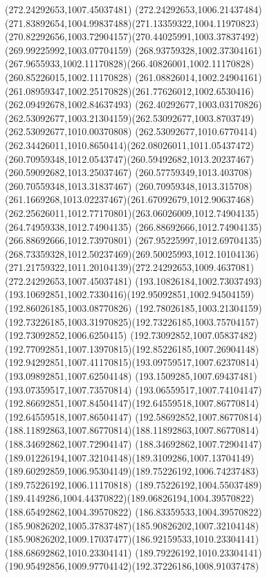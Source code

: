 {{\moveto(272.24292653,1007.45037481)
\curveto(272.24292653,1006.21437484)(271.83892654,1004.99837488)(271.13359322,1004.11970823)
\curveto(270.82292656,1003.72904157)(270.44025991,1003.37837492)(269.99225992,1003.07704159)
\curveto(268.93759328,1002.37304161)(267.9655933,1002.11170828)(266.40826001,1002.11170828)
\lineto(260.85226015,1002.11170828)
\lineto(261.08826014,1002.24904161)
\curveto(261.08959347,1002.25170828)(261.77626012,1002.6530416)(262.09492678,1002.84637493)
\curveto(262.40292677,1003.03170826)(262.53092677,1003.21304159)(262.53092677,1003.8703749)
\lineto(262.53092677,1010.00370808)
\curveto(262.53092677,1010.6770414)(262.34426011,1010.8650414)(262.08026011,1011.05437472)
\curveto(260.70959348,1012.0543747)(260.59492682,1013.20237467)(260.59092682,1013.25037467)
\lineto(260.57759349,1013.403708)
\lineto(260.70559348,1013.31837467)
\curveto(260.70959348,1013.315708)(261.1669268,1013.02237467)(261.67092679,1012.90637468)
\curveto(262.25626011,1012.77170801)(263.06026009,1012.74904135)(264.74959338,1012.74904135)
\lineto(266.88692666,1012.74904135)
\lineto(266.88692666,1012.73970801)
\curveto(267.95225997,1012.69704135)(268.73359328,1012.50237469)(269.50025993,1012.10104136)
\curveto(271.21759322,1011.20104139)(272.24292653,1009.4637081)(272.24292653,1007.45037481)
\moveto(193.10826184,1002.73037493)
\curveto(193.10692851,1002.7330416)(192.95092851,1002.94504159)(192.86026185,1003.08770826)
\curveto(192.78026185,1003.21304159)(192.73226185,1003.31970825)(192.73226185,1003.75704157)
\lineto(192.73092852,1006.6250415)
\curveto(192.73092852,1007.05837482)(192.77092851,1007.13970815)(192.85226185,1007.26904148)
\curveto(192.94292851,1007.41170815)(193.09759517,1007.62370814)(193.09892851,1007.62504148)
\lineto(193.1509285,1007.69437481)
\lineto(193.07359517,1007.73570814)
\curveto(193.06559517,1007.74104147)(192.86692851,1007.84504147)(192.64559518,1007.86770814)
\lineto(192.64559518,1007.86504147)
\curveto(192.58692852,1007.86770814)(188.11892863,1007.86770814)(188.11892863,1007.86770814)
\lineto(188.34692862,1007.72904147)
\curveto(188.34692862,1007.72904147)(189.01226194,1007.32104148)(189.3109286,1007.13704149)
\curveto(189.60292859,1006.95304149)(189.75226192,1006.74237483)(189.75226192,1006.11170818)
\lineto(189.75226192,1004.55037489)
\curveto(189.4149286,1004.44370822)(189.06826194,1004.39570822)(188.65492862,1004.39570822)
\curveto(186.83359533,1004.39570822)(185.90826202,1005.37837487)(185.90826202,1007.32104148)
\curveto(185.90826202,1009.17037477)(186.92159533,1010.23304141)(188.68692862,1010.23304141)
\curveto(189.79226192,1010.23304141)(190.95492856,1009.97704142)(192.37226186,1008.91037478)
}}
